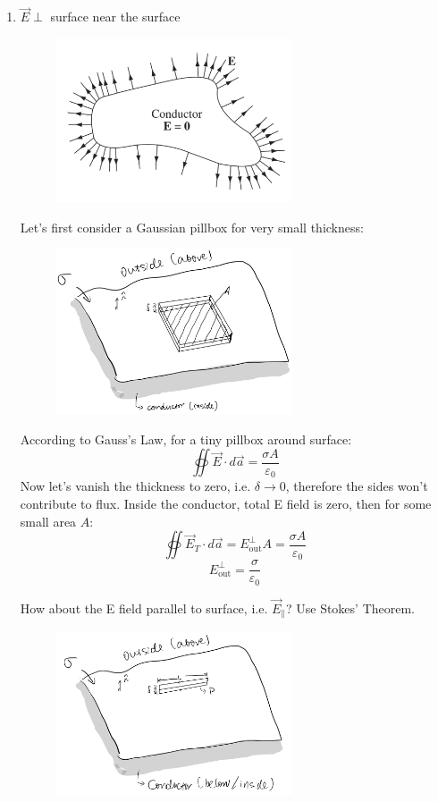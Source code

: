 \documentclass[12pt,a4paper,twoside]{article}
\begin{document}
\begin{enumerate}
        \item \(\overrightarrow{E}\perp\) surface near the surface
        \begin{figure}[ht]
            \centering
            \includegraphics[width=7cm]{250-Revision/fig-2.43.png}
            \label{fig:2.43}
        \end{figure}
        
        Let's first consider a Gaussian pillbox for very small thickness:
        \begin{figure}[ht]
            \centering
            \includegraphics[width=7cm]{250-Revision/gaussian-pillbox-conductor.png}
        \end{figure}
        
        According to Gauss's Law, for a tiny pillbox around surface:
        \[\oiint \overrightarrow{E}\cdot d\overrightarrow{a}=\frac{\sigma A}{\varepsilon_0}\]
        Now let's vanish the thickness to zero, i.e. $\delta\to 0$, therefore the sides won't contribute to flux.
        Inside the conductor, total E field is zero, then for some small area $A$:
        \[\oiint \overrightarrow{E}_{T}\cdot d\overrightarrow{a}=E^{\perp}_{\mathrm{out}}A=\frac{\sigma A}{\varepsilon_0}\]
        \[E^{\perp}_{\mathrm{out}}=\frac{\sigma}{\varepsilon_0}\]
        
        How about the E field parallel to surface, i.e. $\overrightarrow{E}_\parallel$? Use Stokes' Theorem.
        \begin{figure}[ht]
            \centering
            \includegraphics[width=7cm]{250-Revision/gaussian-pillbox-conductor-2.png}
        \end{figure}
        

\end{enumerate}
\end{document}
